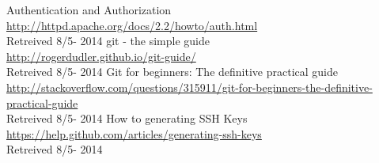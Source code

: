 Authentication and Authorization \\
\url{http://httpd.apache.org/docs/2.2/howto/auth.html}\\
Retreived 8/5- 2014
 git - the simple guide \\
\url{http://rogerdudler.github.io/git-guide/}\\
Retreived 8/5- 2014
 Git for beginners: The definitive practical guide \\
\url{http://stackoverflow.com/questions/315911/git-for-beginners-the-definitive-practical-guide}\\
Retreived 8/5- 2014
 How to generating SSH Keys\\
\url{https://help.github.com/articles/generating-ssh-keys}\\
Retreived 8/5- 2014
